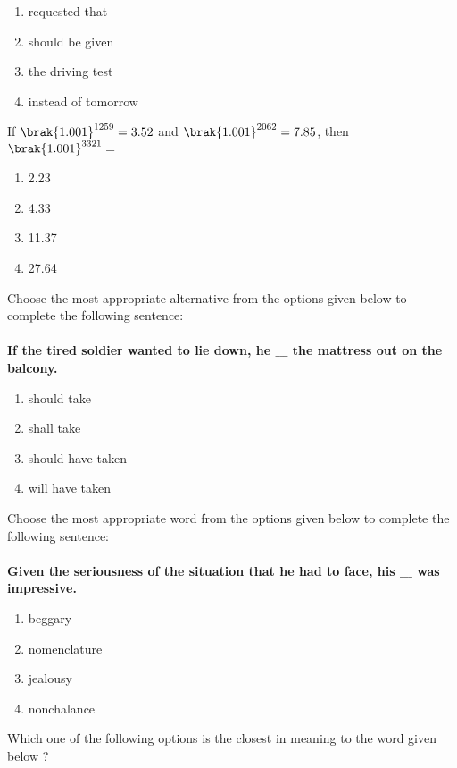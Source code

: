  \begin{enumerate}
     \item requested that
     \item should be given
     \item the driving test
     \item instead of tomorrow \\
 \end{enumerate}
\item If $\brak{1.001}^{1259} = 3.52$ and $\brak{1.001}^{2062} = 7.85$, then $\brak{1.001}^{3321} = $
\begin{enumerate}
   \item 2.23
   \item 4.33
   \item 11.37
   \item 27.64 \\
\end{enumerate}
\item Choose the most appropriate alternative from the options given below to complete the following sentence:\\\\
\textbf{If the tired soldier wanted to lie down, he $\_\_\_$ the mattress out on the balcony.}
\begin{enumerate}
    \item should take
    \item shall take
    \item should have taken
    \item will have taken \\
\end{enumerate}
\item Choose the most appropriate word from the options given below to complete the following sentence: \\\\
\textbf{Given the seriousness of the situation that he had to face, his $\_\_\_$ was impressive.}
\begin{enumerate}
    \item beggary
    \item nomenclature 
    \item jealousy
    \item nonchalance \\
\end{enumerate}
\item Which one of the following options is the closest in meaning to the word given below ? \\\\
